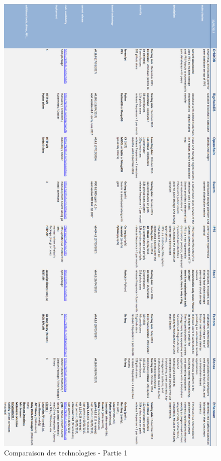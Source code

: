 \documentclass{tnreport}
\begin{document}
\begin{figure}[h]
	\centering
	\includegraphics[scale=0.5]{figures/blockchain-technologies-comparison-part1}
	\caption{Comparaison des technologies - Partie 1}
	\label{fig:comparison-part1}
\end{figure}
\end{document}
